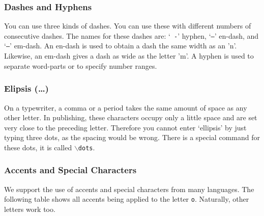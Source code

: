 \documentclass[11pt]{article}
\newcommand{\cmd}[1]{{\tt $\backslash$#1}}
\begin{document}
\subsubsection{Dashes and Hyphens}



You can use three kinds of dashes. You can use these with different
numbers of consecutive dashes. The names for these dashes are: `{\tt
  -}' hyphen, `{\tt --}' en-dash, and `{\tt ---}' em-dash. An en-dash
is used to obtain a dash the same width as an 'n'. Likewise, an
em-dash gives a dash as wide as the letter 'm'. A hyphen is used to
separate word-parts or to specify number ranges.



\subsubsection{Elipsis (\ldots)}

On a typewriter, a comma or a period takes the same amount of space as
any other letter. In publishing, these characters occupy only a little
space and are set very close to the preceding letter. Therefore you
cannot enter `ellipsis' by just typing three dots, as the spacing
would be wrong. There is a special command for these dots, it is
called \cmd{dots}.

\subsubsection{Accents and Special Characters}

We support the use of accents and special characters from many
languages. The following table shows all accents being applied to the
letter {\tt o}. Naturally, other letters work too.

\end{document}
